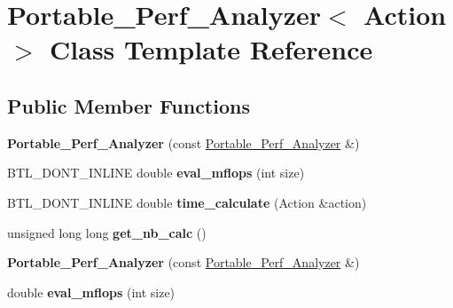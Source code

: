 \hypertarget{class_portable___perf___analyzer}{}\section{Portable\+\_\+\+Perf\+\_\+\+Analyzer$<$ Action $>$ Class Template Reference}
\label{class_portable___perf___analyzer}
\subsection*{Public Member Functions}
\begin{DoxyCompactItemize}
\item 
\mbox{\label{class_portable___perf___analyzer_a7722dc21fa0a3934784f1a7dada50690}} 
{\bfseries Portable\+\_\+\+Perf\+\_\+\+Analyzer} (const \hyperlink{class_portable___perf___analyzer}{Portable\+\_\+\+Perf\+\_\+\+Analyzer} \&)
\item 
\mbox{\label{class_portable___perf___analyzer_a03155b3441f25085e43cb322be9937af}} 
B\+T\+L\+\_\+\+D\+O\+N\+T\+\_\+\+I\+N\+L\+I\+NE double {\bfseries eval\+\_\+mflops} (int size)
\item 
\mbox{\label{class_portable___perf___analyzer_a79a8450d03fa507442062882b4ef864f}} 
B\+T\+L\+\_\+\+D\+O\+N\+T\+\_\+\+I\+N\+L\+I\+NE double {\bfseries time\+\_\+calculate} (Action \&action)
\item 
\mbox{\label{class_portable___perf___analyzer_ae91f498b2c5b6d05eb6ae54458d5ff7f}} 
unsigned long long {\bfseries get\+\_\+nb\+\_\+calc} ()
\item 
\mbox{\label{class_portable___perf___analyzer_a7722dc21fa0a3934784f1a7dada50690}} 
{\bfseries Portable\+\_\+\+Perf\+\_\+\+Analyzer} (const \hyperlink{class_portable___perf___analyzer}{Portable\+\_\+\+Perf\+\_\+\+Analyzer} \&)
\item 
\mbox{\label{class_portable___perf___analyzer_a10688ff64fdaf9bcd34b7beec0a6ba3f}} 
double {\bfseries eval\+\_\+mflops} (int size)
\item 

\end{DoxyCompactItemize}
